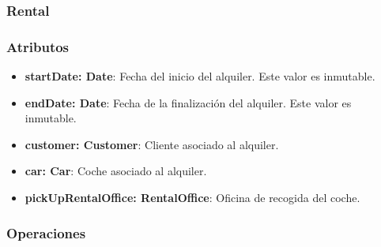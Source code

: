 \subsubsection{Rental}

\subsubsection*{Atributos}

\begin{itemize}
    \item \textbf{startDate: Date}: Fecha del inicio del alquiler. Este valor es inmutable.
    \item \textbf{endDate: Date}: Fecha de la finalización del alquiler. Este valor es inmutable.
    \item \textbf{customer: Customer}: Cliente asociado al alquiler. 
    \item \textbf{car: Car}: Coche asociado al alquiler. 
    \item \textbf{pickUpRentalOffice: RentalOffice}: Oficina de recogida del coche.
\end{itemize}

\subsubsection*{Operaciones}


